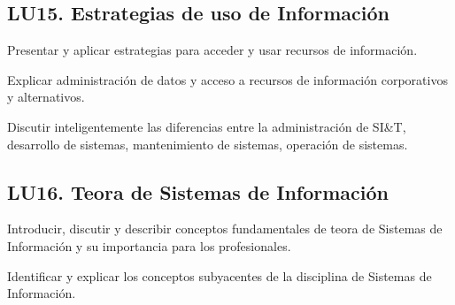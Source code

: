 \subsection{LU15. Estrategias de uso de Información}\label{sec:LU15}
\begin{LearningUnit}
\begin{LUGoal}
\item Presentar y aplicar estrategias para acceder y usar recursos de información.
\end{LUGoal}

\begin{LUObjective}
\item Explicar administración de datos y acceso a recursos de información corporativos y alternativos.
\item Discutir inteligentemente las diferencias entre la administración de SI\&T, desarrollo de sistemas, mantenimiento de sistemas, operación de sistemas.
\end{LUObjective}
\end{LearningUnit}

\subsection{LU16. Teor­a de Sistemas de Información}\label{sec:LU16}
\begin{LearningUnit}
\begin{LUGoal}
\item Introducir, discutir y describir conceptos fundamentales de teor­a de Sistemas de Información y su importancia para los profesionales.
\end{LUGoal}

\begin{LUObjective}
\item Identificar y explicar los conceptos subyacentes de la disciplina de Sistemas de Información.
\end{LUObjective}
\end{LearningUnit}

